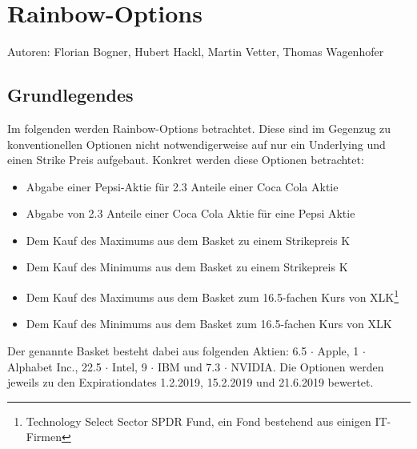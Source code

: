 \documentclass[a4paper,12pt]{article}
\numberwithin[\arabic]{Satz}{section}
\begin{document}
	\section*{Rainbow-Options}
	Autoren: Florian Bogner, Hubert Hackl, Martin Vetter, Thomas Wagenhofer
		\subsection*{Grundlegendes}
			Im folgenden werden Rainbow-Options betrachtet. Diese sind im Gegenzug zu konventionellen Optionen nicht notwendigerweise auf nur ein Underlying und einen Strike Preis aufgebaut.
			\newline
			Konkret werden diese Optionen betrachtet:
			\begin{itemize}
				\item Abgabe einer Pepsi-Aktie für 2.3 Anteile einer Coca Cola Aktie
				\item Abgabe von 2.3 Anteile einer Coca Cola Aktie für eine Pepsi Aktie
				\item Dem Kauf des Maximums aus dem Basket zu einem Strikepreis K
				\item Dem Kauf des Minimums aus dem Basket zu einem Strikepreis K
				\item Dem Kauf des Maximums aus dem Basket zum 16.5-fachen Kurs von XLK\footnote{Technology Select Sector SPDR Fund, ein Fond bestehend aus einigen IT-Firmen}
				\item Dem Kauf des Minimums aus dem Basket zum 16.5-fachen Kurs von XLK
			\end{itemize}
			Der genannte Basket besteht dabei aus folgenden Aktien: 6.5 $\cdot$ Apple, 1 $\cdot$ Alphabet Inc., 22.5 $\cdot$ Intel, 9 $\cdot$ IBM und 7.3 $\cdot$ NVIDIA.
			Die Optionen werden jeweils zu den Expirationdates 1.2.2019, 15.2.2019 und 21.6.2019 bewertet.
\end{document}

